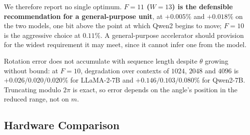 \documentclass[conference]{IEEEtran}
\begin{document}
We therefore report no single optimum. \textbf{$F=11$ ($W=13$) is the
defensible recommendation for a general-purpose unit}, at $+0.005\%$ and
$+0.018\%$ on the two models, one bit above the point at which Qwen2 begins to
move; $F=10$ is the aggressive choice at $0.11\%$. A general-purpose
accelerator should provision for the widest requirement it may meet, since it
cannot infer one from the model.

Rotation error does not accumulate with sequence length despite $\theta$
growing without bound: at $F=10$, degradation over contexts of $1024$, $2048$
and $4096$ is $+0.026/0.020/0.020\%$ for LLaMA-2-7B and
$+0.146/0.103/0.080\%$ for Qwen2-7B. Truncating modulo $2\pi$ is exact, so
error depends on the angle's position in the reduced range, not on $m$.

\subsection{Hardware Comparison}
\label{sec:hw}

\begin{table}[t]
\caption{Complete RoPE units synthesised on the same 45\,nm flow. Energy is
power at the 500\,MHz operating point. $\dagger$ marks a design that consumes
$\sin/\cos$ it does not generate, and is therefore not a complete unit.}
\label{tab:perf}
\centering
{}
\end{table}
\end{document}
